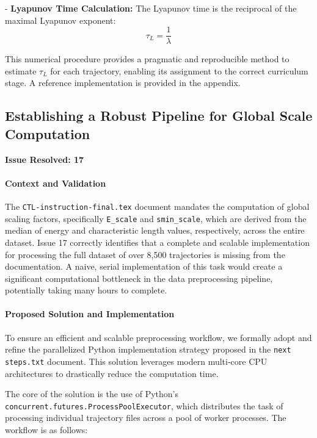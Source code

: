 \begin{enumerate}
- \textbf{Lyapunov Time Calculation:} The Lyapunov time is the reciprocal of the maximal Lyapunov exponent:
        \begin{equation}
            \tau_L = \frac{1}{\lambda}
        \end{equation}

    This numerical procedure provides a pragmatic and reproducible method to estimate $\tau_L$ for each trajectory, enabling its assignment to the correct curriculum stage. A reference implementation is provided in the appendix.
\end{enumerate}






\subsection{Establishing a Robust Pipeline for Global Scale Computation}
\textbf{Issue Resolved: 17}
\paragraph{Context and Validation}
The \texttt{CTL-instruction-\allowbreak final.tex} document mandates the computation of global scaling factors, specifically \texttt{E\_scale} and \texttt{smin\_scale}, which are derived from the median of energy and characteristic length values, respectively, across the entire dataset. Issue 17 correctly identifies that a complete and scalable implementation for processing the full dataset of over 8,500 trajectories is missing from the documentation. A naive, serial implementation of this task would create a significant computational bottleneck in the data preprocessing pipeline, potentially taking many hours to complete.

\paragraph{Proposed Solution and Implementation}
To ensure an efficient and scalable preprocessing workflow, we formally adopt and refine the parallelized Python implementation strategy proposed in the \texttt{next steps.txt} document. This solution leverages modern multi-core CPU architectures to drastically reduce the computation time.

The core of the solution is the use of Python's \texttt{concurrent.futures.ProcessPoolExecutor}, which distributes the task of processing individual trajectory files across a pool of worker processes. The workflow is as follows:


